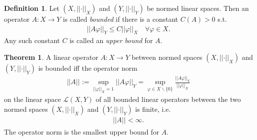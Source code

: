 \documentclass[12pt, a4paper]{article}
\numberwithin{equation}{section}
\theoremstyle{definition}
\theoremstyle{definition}
\newtheorem{defn}[thm]{Definition} %
\newtheorem{theorem}[thm]{Theorem}
\newcommand{\norm}[2]{\left\vert\left\vert #1 \right\vert\right\vert_{#2}}
\begin{document}
	\begin{defn}\label{defn:boundedness_operator}
		Let $\left(X, \norm{\cdot}{X}\right)$ and $(Y, \norm{\cdot}{Y})$ be normed linear spaces. Then an operator $A: X\to Y$ is called \textit{bounded} if there is a constant $C(A) > 0$ s.t. 
		\begin{align}
			\norm{A\varphi}{Y} \leq C \norm{\varphi}{X} \quad\forall \varphi\in X.
		\end{align}
		Any such constant $C$ is called an \textit{upper bound} for $A$.
	\end{defn}

	\begin{theorem}
		A linear operator $A: X\to Y$ between normed spaces $(X, \norm{\cdot}{X})$ and $(Y, \norm{\cdot}{Y})$ is bounded iff the operator norm
		\begin{align}
			\norm{A}{} := \sup_{\norm{\varphi}{X} = 1}\norm{A\varphi}{Y} = \sup_{\varphi\in X\backslash \{0\}}\frac{\norm{A\varphi}{Y}}{\norm{\varphi}{X}}
		\end{align}
		on the linear space $\mathcal L(X, Y)$ of all bounded linear operators between the two normed spaces $(X, \norm{\cdot}{X})$ and $(Y, \norm{\cdot}{Y})$ is finite, i.e. 
		\begin{align}
			\norm{A}{} < \infty. 
		\end{align} 
		The operator norm is the smallest upper bound for $A$.
	\end{theorem}
	
\end{document}
